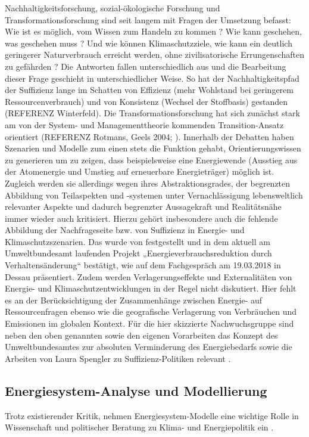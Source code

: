 \documentclass[a4paper,11pt,twoside]{scrartcl}
\begin{document}
Nachhaltigkeitsforschung, sozial-ökologische Forschung und Transformationsforschung sind seit langem mit Fragen der Umsetzung befasst: Wie ist es möglich, vom Wissen zum Handeln zu kommen \cite{BMBF2008} ? Wie kann geschehen, was geschehen 
muss \cite{Linz2000} ? Und wie können Klimaschutzziele, wie kann ein deutlich geringerer Naturverbrauch erreicht werden, ohne zivilisatorische Errungenschaften zu gefährden \cite{Sommer2016,WGBU2011} ? Die Antworten fallen unterschiedlich aus und die Bearbeitung dieser Frage geschieht in unterschiedlicher Weise. So hat der Nachhaltigkeitspfad der Suffizienz lange im Schatten von Effizienz (mehr Wohlstand bei geringerem Ressourcenverbrauch) und von Konsistenz (Wechsel der Stoffbasis) gestanden (REFERENZ Winterfeld). Die Transformationsforschung hat sich zunächst stark am von der System- und Managementtheorie kommenden Transition-Ansatz orientiert (REFERENZ Rotmans, Geels 2004; \cite{Loorback2010}). Innerhalb der Debatten haben Szenarien und Modelle zum einen stets die Funktion gehabt, Orientierungswissen zu generieren um zu zeigen, dass beispielsweise eine Energiewende (Ausstieg aus der Atomenergie und Umstieg auf erneuerbare Energieträger) möglich ist. Zugleich werden sie allerdings wegen ihres Abstraktionsgrades, der begrenzten Abbildung von Teilaspekten und -systemen unter Vernachlässigung lebensweltlich relevanter Aspekte und dadurch begrenzter Aussagekraft und Realitätsnähe immer wieder auch kritisiert. Hierzu gehört insbesondere auch die fehlende Abbildung der Nachfrageseite bzw. von Suffizienz in Energie- und Klimaschutzszenarien. Das wurde von \cite{Samadi2017} festgestellt und in dem aktuell am Umweltbundesamt laufenden Projekt „Energieverbrauchsreduktion durch Verhaltensänderung“ bestätigt, wie auf dem Fachgespräch am 19.03.2018 in Dessau präsentiert. Zudem werden Verlagerungseffekte und Externalitäten von Energie- und Klimaschutzentwicklungen in der Regel nicht diskutiert. Hier fehlt es an der Berücksichtigung der Zusammenhänge zwischen Energie- auf Ressourcenfragen ebenso wie die geografische Verlagerung von Verbräuchen und Emissionen im globalen Kontext.
Für die hier skizzierte Nachwuchsgruppe sind neben den oben genannten sowie den eigenen Vorarbeiten das Konzept des Umweltbundesamtes zur absoluten Verminderung des Energiebedarfs \cite{UBA2016} sowie die Arbeiten von Laura Spengler zu Suffizienz-Politiken relevant \cite{Spengler2016,Spengler2018}.

\subsection*{Energiesystem-Analyse und Modellierung}
Trotz existierender Kritik, nehmen Energiesystem-Modelle eine wichtige Rolle in Wissenschaft und politischer Beratung zu Klima- und Energiepolitik ein \cite{Dieckhoff2015}.
\end{document}
